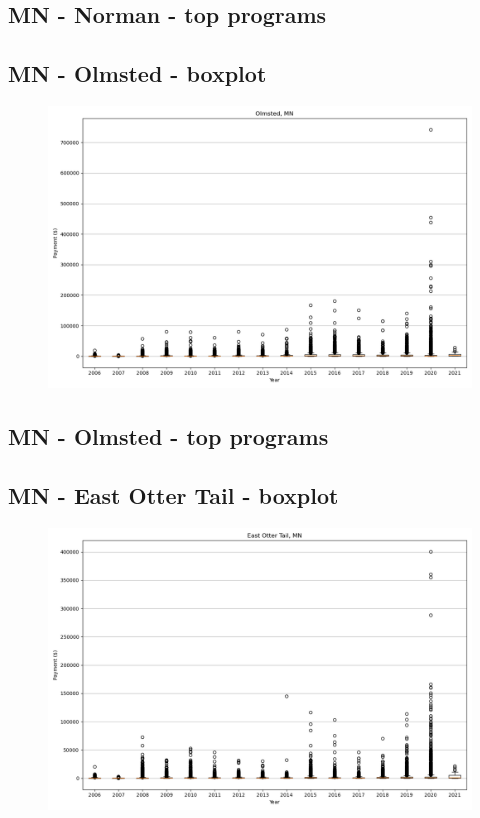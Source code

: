 \subsection*{MN - Norman - top programs}

\newpage
\subsection*{MN - Olmsted - boxplot}
\begin{figure}[h]
\centering
\includegraphics[width=7in]{../output/boxplots/counties/Olmsted-MN_boxplot.png}
\end{figure}


\subsection*{MN - Olmsted - top programs}

\newpage
\subsection*{MN - East Otter Tail - boxplot}
\begin{figure}[h]
\centering
\includegraphics[width=7in]{../output/boxplots/counties/East Otter Tail-MN_boxplot.png}
\end{figure}


